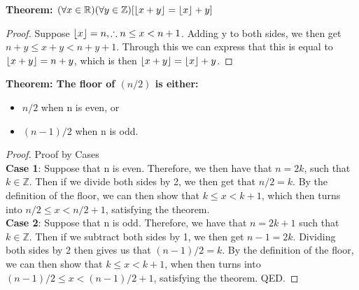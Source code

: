 \begin{example}
    \textbf{Theorem: $(\forall x \in \mathbb{R})(\forall y \in \mathbb{Z})[\left\lfloor x+y \right\rfloor=\left\lfloor x \right\rfloor+y]$}
\end{example}

\begin{proof}
    Suppose $\left\lfloor x \right\rfloor=n, \therefore n \leq x < n+1$. Adding y to both sides, we then get $n+y \leq x+y < n+y+1$. Through this we can express that this is equal to $\left\lfloor x+y \right\rfloor=n+y$, which is then $\left\lfloor x+y \right\rfloor=\left\lfloor x \right\rfloor+y$.
\end{proof}

\begin{example}
    \textbf{Theorem: The floor of $(n/2)$ is either:}
    \begin{itemize}
        \item $n/2$ when n is even, or
        \item $(n-1)/2$ when n is odd.
    \end{itemize}
\end{example}

\begin{proof}
	Proof by Cases\\
	\textbf{Case 1}: Suppose that n is even. Therefore, we then have that $n=2k$, such that $k \in \mathbb{Z}.$ Then if we divide both sides by 2, we then get that $n/2=k$. By the definition of the floor, we can then show that $k\leq x < k + 1$, which then turns into $n/2 \leq x < n/2 +1$, satisfying the theorem.\\
	\textbf{Case 2}: Suppose that n is odd. Therefore, we have that $n=2k+1$ such that $k \in \mathbb{Z}.$ Then if we subtract both sides by 1, we then get $n-1=2k$. Dividing both sides by 2 then gives us that $(n-1)/2=k$. By the definition of the floor, we can then show that $k\leq x < k + 1$, when then turns into $(n-1)/2 \leq x < (n-1)/2+1$, satisfying the theorem. QED.
\end{proof}
